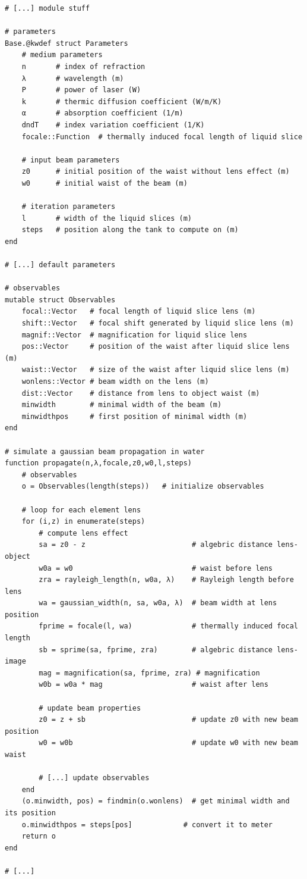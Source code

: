 \juliastyle
\begin{lstlisting}
# [...] module stuff

# parameters
Base.@kwdef struct Parameters
    # medium parameters
    n       # index of refraction
    λ       # wavelength (m)
    P       # power of laser (W)
    k       # thermic diffusion coefficient (W/m/K)
    α       # absorption coefficient (1/m)
    dndT    # index variation coefficient (1/K)
    focale::Function  # thermally induced focal length of liquid slice

    # input beam parameters    
    z0      # initial position of the waist without lens effect (m)
    w0      # initial waist of the beam (m)
    
    # iteration parameters
    l       # width of the liquid slices (m)
    steps   # position along the tank to compute on (m)
end

# [...] default parameters
   
# observables
mutable struct Observables
    focal::Vector   # focal length of liquid slice lens (m)
    shift::Vector   # focal shift generated by liquid slice lens (m)
    magnif::Vector  # magnification for liquid slice lens 
    pos::Vector     # position of the waist after liquid slice lens (m)
    waist::Vector   # size of the waist after liquid slice lens (m)
    wonlens::Vector # beam width on the lens (m)
    dist::Vector    # distance from lens to object waist (m)
    minwidth        # minimal width of the beam (m)
    minwidthpos     # first position of minimal width (m)
end

# simulate a gaussian beam propagation in water
function propagate(n,λ,focale,z0,w0,l,steps)
    # observables
    o = Observables(length(steps))   # initialize observables

    # loop for each element lens
    for (i,z) in enumerate(steps)        
        # compute lens effect
        sa = z0 - z                         # algebric distance lens-object
        w0a = w0                            # waist before lens
        zra = rayleigh_length(n, w0a, λ)    # Rayleigh length before lens
        wa = gaussian_width(n, sa, w0a, λ)  # beam width at lens position
        fprime = focale(l, wa)              # thermally induced focal length
        sb = sprime(sa, fprime, zra)        # algebric distance lens-image
        mag = magnification(sa, fprime, zra) # magnification
        w0b = w0a * mag                     # waist after lens

        # update beam properties
        z0 = z + sb                         # update z0 with new beam position
        w0 = w0b                            # update w0 with new beam waist

        # [...] update observables
    end
    (o.minwidth, pos) = findmin(o.wonlens)  # get minimal width and its position
    o.minwidthpos = steps[pos]            # convert it to meter
    return o
end

# [...]
\end{lstlisting}

